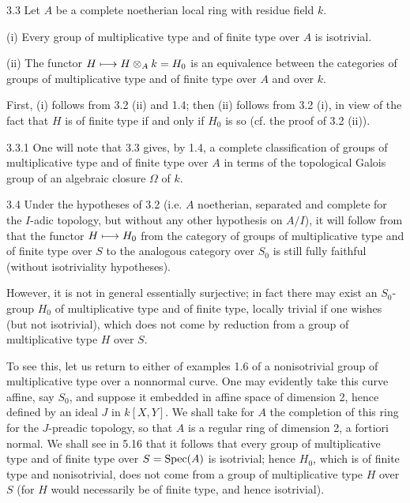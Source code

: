 \begin{corollary}{3.3}\label{X.3.3}
Let $A$ be a complete noetherian local ring with residue field $k$.

(i) Every group of multiplicative type and of finite type over $A$ is isotrivial.

(ii) The functor $H\longmapsto H\otimes_A k=H_0$ is an equivalence between the categories of groups of multiplicative type and of finite type over $A$ and over $k$.
\end{corollary}
\footnotemark[\value{footnote}] First, (i) follows from 3.2 (ii) and 1.4; then (ii) follows from 3.2 (i), in view of the fact that $H$ is of finite type if and only if $H_0$ is so (cf. the proof of 3.2 (ii)).
\begin{remark}{3.3.1}\label{X.3.3.1}
One will note that 3.3 gives, by 1.4, a complete classification of groups of multiplicative type and of finite type over $A$ in terms of the topological Galois group of an algebraic closure $\Omega$ of $k$.
\end{remark}
\begin{remarks}{3.4}\label{X.3.4}
Under the hypotheses of 3.2 (i.e. $A$ noetherian, separated and complete for the $I$-adic topology, but without any other hypothesis on $A/I$), it will follow from  that the functor $H\longmapsto H_0$ from the category of groups of multiplicative type and of finite type over $S$ to the analogous category over $S_0$ is still fully faithful (without isotriviality hypotheses).

However, it is not in general essentially surjective; in fact there may exist an $S_0$-group $H_0$ of multiplicative type and of finite type, locally trivial if one wishes (but not isotrivial), which does not come by reduction from a group of multiplicative type $H$ over $S$.

To see this, let us return to either of examples 1.6 of a nonisotrivial group of multiplicative type over a nonnormal curve. One may evidently take this curve affine, say $S_0$, and suppose it embedded in affine space of dimension 2, hence defined by an ideal $J$ in $k[X,Y]$. We shall take for $A$ the completion of this ring for the $J$-preadic topology, so that $A$ is a regular ring of dimension 2, a fortiori normal. We shall see in 5.16 that it follows that every group of multiplicative type and of finite type over $S=\operatorname{Spec}(A)$ is isotrivial; hence $H_0$, which is of finite type and nonisotrivial, does not come from a group of multiplicative type $H$ over $S$ (for $H$ would necessarily be of finite type, and hence isotrivial).
\end{remarks}

